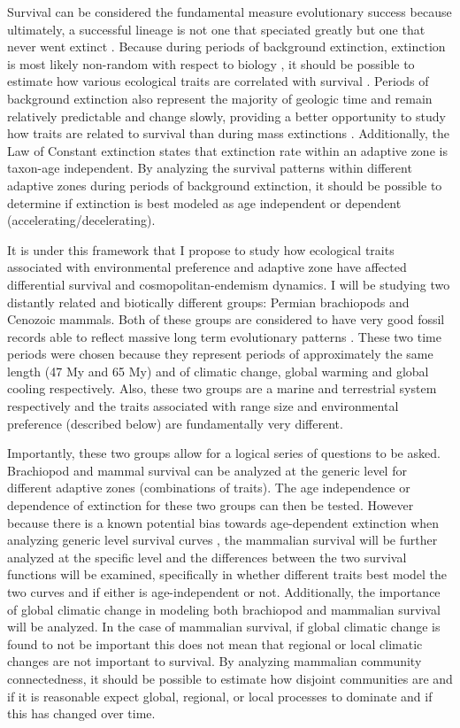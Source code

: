 \documentclass[12pt,letterpaper]{article}
\begin{document}
Survival can be considered the fundamental measure evolutionary success because ultimately, a successful lineage is not one that speciated greatly but one that never went extinct \citep{Cooper1984,Palmer2012}. Because during periods of background extinction, extinction is most likely non-random with respect to biology \citep{Jablonski1986}, it should be possible to estimate how various ecological traits are correlated with survival \citep{Kitchell1990,Kitchell1985a}. Periods of background extinction also represent the majority of geologic time and remain relatively predictable and change slowly, providing a better opportunity to study how traits are related to survival than during mass extinctions \citep{Jablonski1986,Raup1988}. Additionally, the Law of Constant extinction \citep{VanValen1973} states that extinction rate within an adaptive zone is taxon-age independent. By analyzing the survival patterns within different adaptive zones during periods of background extinction, it should be possible to determine if extinction is best modeled as age independent or dependent (accelerating/decelerating).

It is under this framework that I propose to study how ecological traits associated with environmental preference and adaptive zone have affected differential survival and cosmopolitan-endemism dynamics. I will be studying two distantly related and biotically different groups: Permian brachiopods and Cenozoic mammals. Both of these groups are considered to have very good fossil records able to reflect massive long term evolutionary patterns \citep{Mark1977}. These two time periods were chosen because they represent periods of approximately the same length (47 My and 65 My) and of climatic change, global warming and global cooling respectively. Also, these two groups are a marine and terrestrial system respectively and the traits associated with range size and environmental preference (described below) are fundamentally very different. 

Importantly, these two groups allow for a logical series of questions to be asked. Brachiopod and mammal survival can be analyzed at the generic level for different adaptive zones (combinations of traits). The age independence or dependence of extinction for these two groups can then be tested. However because there is a known potential bias towards age-dependent extinction when analyzing generic level survival curves \citep{Simpson2006,Raup1978,Raup1991a}, the mammalian survival will be further analyzed at the specific level and the differences between the two survival functions will be examined, specifically in whether different traits best model the two curves and if either is age-independent or not. Additionally, the importance of global climatic change in modeling both brachiopod and  mammalian survival will be analyzed. In the case of mammalian survival, if global climatic change is found to not be important this does not mean that regional or local climatic changes are not important to survival. By analyzing mammalian community connectedness, it should be possible to estimate how disjoint communities are and if it is reasonable expect global, regional, or local processes to dominate and if this has changed over time.
\end{document}
